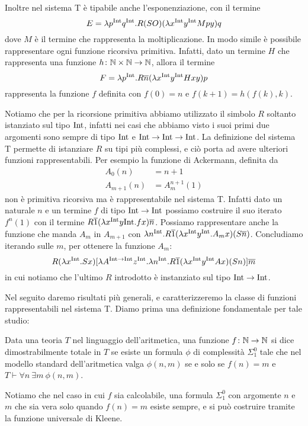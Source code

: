 \documentclass[]{marticle}
\begin{document}
Inoltre nel sistema T \`e tipabile anche l'esponenziazione, con il termine
\[
    E = \lambda p^{\text{Int}} q^{\text{Int}} . R (SO) (\lambda x^{\text{Int}} y^{\text{Int}} Mpy) q
\]
dove $M$ \`e il termine che rappresenta la moltiplicazione. In modo simile \` e
possibile rappresentare ogni funzione ricorsiva primitiva. Infatti, dato un
termine $H$ che rappresenta una funzione $h\colon\mathbb{N}\times\mathbb{N}\rightarrow\mathbb{N}$, allora il
termine
\[
    F = \lambda p^{\text{Int}} . R \overline{n} (\lambda x^{\text{Int}} y^{\text{Int}} Hxy) p
\]
rappresenta la funzione $f$ definita con $f(0) = n$ e $f(k+1) = h(f(k),k)$.

Notiamo che per la ricorsione primitiva abbiamo utilizzato il simbolo $R$
soltanto istanziato sul tipo $\text{Int}$, infatti nei casi che abbiamo visto i suoi
primi due argomenti sono sempre di tipo $\text{Int}$ e $\text{Int}\rightarrow\text{Int}\rightarrow\text{Int}$.
La definizione del sistema T permette di istanziare $R$ su tipi pi\`u complessi,
e ci\`o porta ad avere ulteriori funzioni rappresentabili. Per esempio la
funzione di Ackermann, definita da
\begin{align*}
    A_0(n) &= n+1\\
    A_{m+1}(n) &= A_m^{n+1}(1)
\end{align*}
non \`e primitiva ricorsiva ma \`e rappresentabile nel sistema T. Infatti dato
un naturale $n$ e un termine $f$ di tipo $\text{Int}\rightarrow\text{Int}$ possiamo costruire il
suo iterato $f^n(1)$ con il termine $R\overline{1}(\lambda x^{\text{Int}} y\text{Int}. fx)
\overline{n}$. Possiamo rappresentare anche la funzione che manda $A_m$ in
$A_{m+1}$ con $\lambda n^{\text{Int}} . R \overline{1} (\lambda x^{\text{Int}} y^{\text{Int}}. A_mx)
(S\overline{n})$. Concludiamo iterando sulle $m$, per ottenere la funzione
$A_m$:
\[
    R (\lambda x^{\text{Int}}. Sx)[\lambda A^{\text{Int}\rightarrow\text{Int}} z^{\text{Int}}. \lambda n^{\text{Int}} . R
    \overline{1} (\lambda x^{\text{Int}} y^{\text{Int}} Ax)(Sn)] \overline{m}
\]
in cui notiamo che l'ultimo $R$ introdotto \`e instanziato sul tipo
$\text{Int}\rightarrow\text{Int}$.

Nel seguito daremo risultati pi\`u generali, e caratterizzeremo la classe di
funzioni rappresentabili nel sistema T. Diamo prima una definizione fondamentale
per tale studio:
\begin{block}[Definizione]
    Data una teoria $T$ nel linguaggio dell'aritmetica, una funzione
    $f\colon\mathbb{N}\rightarrow\mathbb{N}$ si dice dimostrabilmente totale in $T$ se esiste un
    formula $\phi$ di complessit\`a $\Sigma^0_1$ tale che nel modello standard
    dell'aritmetica valga $\phi(n,m)$ se e solo se $f(n)=m$ e $T\vdash \forall
    n\ \exists m\ \phi(n,m)$.
\end{block}

Notiamo che nel caso in cui $f$ sia calcolabile, una formula $\Sigma^0_1$ con
argomente $n$ e $m$ che sia vera solo quando $f(n)=m$ esiste sempre, e si pu\`o
costruire tramite la funzione universale di Kleene.
\end{document}

